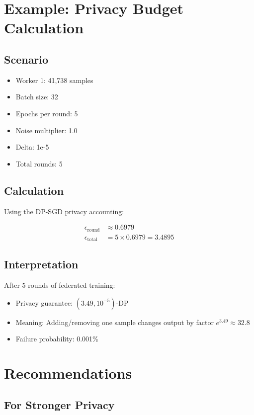 \documentclass[12pt,a4paper]{article}
\begin{document}
\section{Example: Privacy Budget Calculation}

\subsection{Scenario}

\begin{itemize}
    \item Worker 1: 41,738 samples
    \item Batch size: 32
    \item Epochs per round: 5
    \item Noise multiplier: 1.0
    \item Delta: 1e-5
    \item Total rounds: 5
\end{itemize}

\subsection{Calculation}

Using the DP-SGD privacy accounting:

\begin{align}
\epsilon_{\text{round}} &\approx 0.6979 \\
\epsilon_{\text{total}} &= 5 \times 0.6979 = 3.4895
\end{align}

\subsection{Interpretation}

After 5 rounds of federated training:
\begin{itemize}
    \item Privacy guarantee: $(3.49, 10^{-5})$-DP
    \item Meaning: Adding/removing one sample changes output by factor $e^{3.49} \approx 32.8$
    \item Failure probability: 0.001\%
\end{itemize}

\section{Recommendations}

\subsection{For Stronger Privacy}
\end{document}
